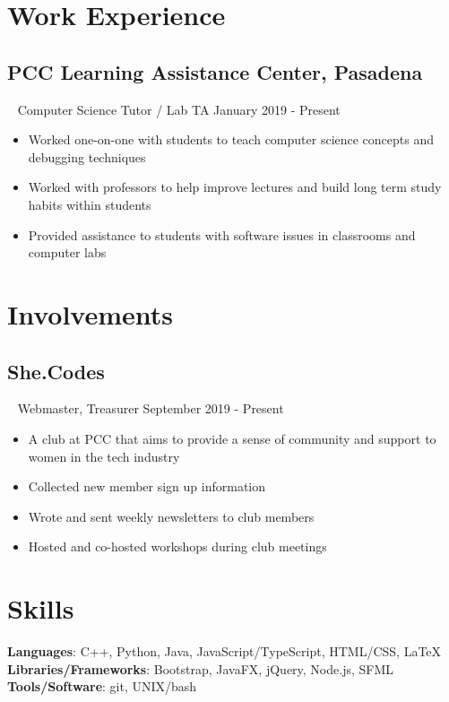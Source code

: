\documentclass{article}
\newcommand{\resumesection}[3]{
    \subsection*{#1}
    \ 
    \footnotesize
    \textcolor{wordgrey}{#2}
    \normalsize
    \hfill
    \textcolor{wordgrey}{#3}
}
\begin{document}
\section*{Work Experience}
\resumesection{PCC Learning Assistance Center, Pasadena}{Computer Science Tutor / Lab TA}{January 2019 - Present}
\begin{itemize}
    \item Worked one-on-one with students to teach computer science concepts and debugging techniques
    \item Worked with professors to help improve lectures and build long term study habits within students
    \item Provided assistance to students with software issues in classrooms and computer labs
\end{itemize}
\hfill

\section*{Involvements}
\resumesection{She.Codes}{Webmaster, Treasurer}{September 2019 - Present}
\begin{itemize}
    \item A club at PCC that aims to provide a sense of community and support to women in the tech industry
    \item Collected new member sign up information
    \item Wrote and sent weekly newsletters to club members
    \item Hosted and co-hosted workshops during club meetings
\end{itemize}
\hfill

\section*{Skills}
\textbf{Languages}: C++, Python, Java, JavaScript/TypeScript, HTML/CSS, {\selectfont\LaTeX}\\
\textbf{Libraries/Frameworks}: Bootstrap, JavaFX, jQuery, Node.js, SFML\\
\textbf{Tools/Software}: git, UNIX/bash
\end{document}
